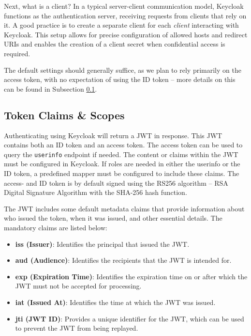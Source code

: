 Next, what is a client? In a typical server-client communication model, Keycloak functions as the authentication server, receiving requests from clients that rely on it. A good practice is to create a separate client for each \textit{client} interacting with Keycloak. This setup allows for precise configuration of allowed hosts and redirect URIs and enables the creation of a client secret when confidential access is required.

The default settings should generally suffice, as we plan to rely primarily on the access token, with no expectation of using the ID token -- more details on this can be found in Subsection \ref{sec:token_claims}.

\subsection{Token Claims \& Scopes}\label{sec:token_claims}
Authenticating using Keycloak will return a JWT in response. This JWT contains both an ID token and an access token. The access token can be used to query the \texttt{userinfo} endpoint if needed. The content or claims within the JWT must be configured in Keycloak. If roles are needed in either the userinfo or the ID token, a predefined mapper must be configured to include these claims. The access- and ID token is by default signed using the RS256 algorithm -- RSA Digital Signature Algorithm with the SHA-256 hash function.

The JWT includes some default metadata claims that provide information about who issued the token, when it was issued, and other essential details. The mandatory claims are listed below:

\begin{itemize} 
    \item \textbf{iss (Issuer)}: Identifies the principal that issued the JWT.
    \item \textbf{aud (Audience)}: Identifies the recipients that the JWT is intended for. 
    \item \textbf{exp (Expiration Time)}: Identifies the expiration time on or after which the JWT must not be accepted for processing. 
    \item \textbf{iat (Issued At)}: Identifies the time at which the JWT was issued. 
    \item \textbf{jti (JWT ID)}: Provides a unique identifier for the JWT, which can be used to prevent the JWT from being replayed. 
\end{itemize}

